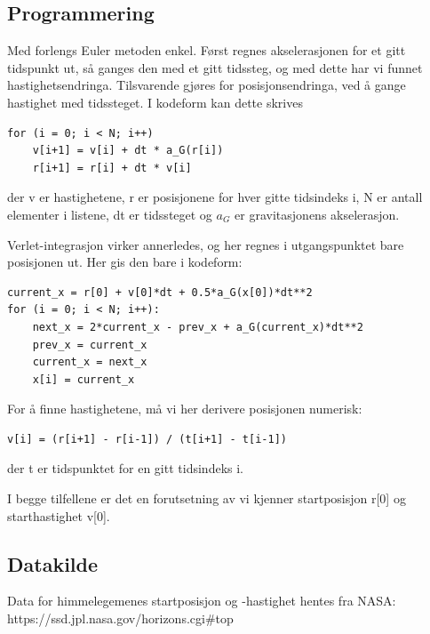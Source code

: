 \documentclass[a4paper,10pt,english]{article}
\begin{document}
\subsection*{Programmering}
Med forlengs Euler metoden enkel. Først regnes akselerasjonen
for et gitt tidspunkt ut, så ganges den med et gitt tidssteg,
og med dette har vi funnet hastighetsendringa. Tilsvarende
gjøres for posisjonsendringa, ved å gange hastighet med
tidssteget. I kodeform kan dette skrives
\begin{lstlisting}
for (i = 0; i < N; i++)
    v[i+1] = v[i] + dt * a_G(r[i])
    r[i+1] = r[i] + dt * v[i]
\end{lstlisting}
der v er hastighetene, r er posisjonene for hver gitte
tidsindeks i, N er antall elementer i listene, dt er
tidssteget og $a_G$ er gravitasjonens akselerasjon.

Verlet-integrasjon virker annerledes, og her regnes i
utgangspunktet bare posisjonen ut. Her gis den bare i
kodeform:
\begin{lstlisting}
current_x = r[0] + v[0]*dt + 0.5*a_G(x[0])*dt**2
for (i = 0; i < N; i++):
    next_x = 2*current_x - prev_x + a_G(current_x)*dt**2
    prev_x = current_x
    current_x = next_x
    x[i] = current_x
\end{lstlisting}
For å finne hastighetene, må vi her derivere posisjonen
numerisk:
\begin{lstlisting}
v[i] = (r[i+1] - r[i-1]) / (t[i+1] - t[i-1])
\end{lstlisting}
der t er tidspunktet for en gitt tidsindeks i.

I begge tilfellene er det en forutsetning av vi kjenner
startposisjon r[0] og starthastighet v[0].

\subsection*{Datakilde}
Data for himmelegemenes startposisjon og -hastighet
hentes fra NASA: https://ssd.jpl.nasa.gov/horizons.cgi#top
\end{document}
